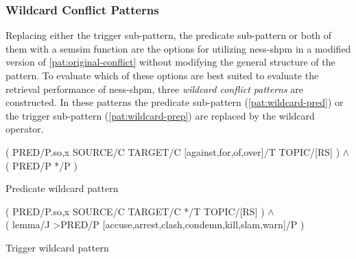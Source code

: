 \documentclass[11pt]{scrreprt}
\begin{document}
{%





\subsubsection{Wildcard Conflict Patterns}
\label{sec:wildcard-conflict-patterns}
Replacing either the trigger sub-pattern, the predicate sub-pattern or both of them with a semsim function are the options for utilizing \gls{ness-shpm} in a modified version of \cref{pat:original-conflict} without modifying the general structure of the pattern. To evaluate which of these options are best suited to evaluate the retrieval performance of \gls{ness-shpm}, three \textit{wildcard conflict patterns} are constructed. In these patterns the predicate sub-pattern (\cref{pat:wildcard-pred}) or the trigger sub-pattern (\cref{pat:wildcard-prep}) are replaced by the wildcard operator. 

\begin{pattern}
  \normalfont\sffamily
  \centering
  ( PRED/P.{so,x} SOURCE/C TARGET/C [against,for,of,over]/T TOPIC/[RS] ) \(\wedge\) \\ ( PRED/P */P )
  \caption{Predicate wildcard pattern}
  \label{pat:wildcard-pred}
\end{pattern}

\begin{pattern}
  \normalfont\sffamily
  \centering
  ( PRED/P.{so,x} SOURCE/C TARGET/C */T TOPIC/[RS] ) \(\wedge\) \\  ( lemma/J >PRED/P [accuse,arrest,clash,condemn,kill,slam,warn]/P )
  \caption{Trigger wildcard pattern}
  \label{pat:wildcard-prep}
\end{pattern}


}
\end{document}
